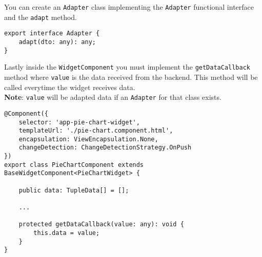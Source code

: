 You can create an \verb|Adapter| class implementing the \verb|Adapter| functional interface and the \verb|adapt| method.
\begin{lstlisting}[caption={Adapter interface}, style=javaScriptCode]
export interface Adapter {
    adapt(dto: any): any;
}
\end{lstlisting}
Lastly inside the \verb|WidgetComponent| you must implement the \verb|getDataCallback| method where \verb|value| is the data received from the backend.  This method will be called everytime the widget receives data.\\
\textbf{Note}: \verb|value| will be adapted data if an \verb|Adapter| for that class exists.
\begin{lstlisting}[caption={PieChartComponent example}, style=javaScriptCode]
@Component({
    selector: 'app-pie-chart-widget',
    templateUrl: './pie-chart.component.html',
    encapsulation: ViewEncapsulation.None,
    changeDetection: ChangeDetectionStrategy.OnPush
})
export class PieChartComponent extends BaseWidgetComponent<PieChartWidget> {

    public data: TupleData[] = [];
  
    ...

    protected getDataCallback(value: any): void {
        this.data = value;
    }
}
\end{lstlisting}

